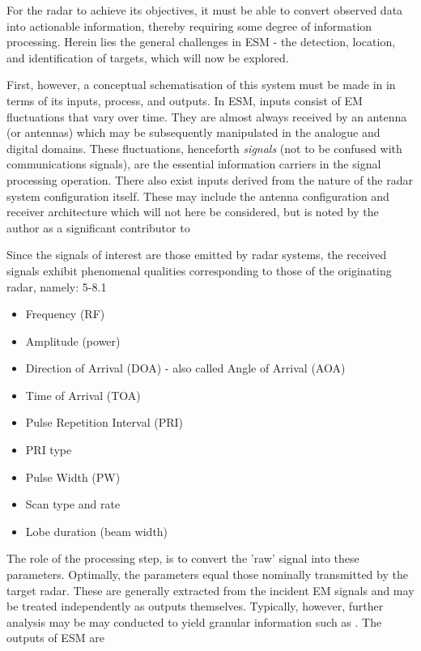For the radar to achieve its objectives, it must be able to convert observed data into actionable information, thereby requiring some degree of information processing. Herein lies the general challenges in ESM - the detection, location, and identification of targets, which will now be explored. %

First, however, a conceptual schematisation of this system must be made in in terms of its inputs, process, and outputs. In ESM, inputs consist of EM fluctuations that vary over time. They are almost always received by an antenna (or antennas) which may be subsequently manipulated in the analogue and digital domains. These fluctuations, henceforth \textit{signals} (not to be confused with communications signals), are the essential information carriers in the signal processing operation. There also exist inputs derived from the nature of the radar system configuration itself. These may include the antenna configuration and receiver architecture which will not here be considered, but is noted by the author as a significant contributor to 



Since the signals of interest are those emitted by radar systems, the received signals exhibit phenomenal qualities corresponding to those of the originating radar, namely: \cite{avionics_department_electronic_2013} 5-8.1
\begin{itemize}
    \item Frequency (RF)%
    \item Amplitude (power)
    \item Direction of Arrival (DOA) - also called Angle of Arrival (AOA)
    \item Time of Arrival (TOA)
    \item Pulse Repetition Interval (PRI)%
    \item PRI type
    \item Pulse Width (PW)
    \item Scan type and rate
    \item Lobe duration (beam width)%
\end{itemize}

The role of the processing step, is to convert the 'raw' signal into these parameters. Optimally, the parameters equal those nominally transmitted by the target radar.
These are generally extracted from the incident EM signals and may be treated independently as outputs themselves. Typically, however, further analysis may be may conducted to yield granular information such as .
The outputs of ESM are 

